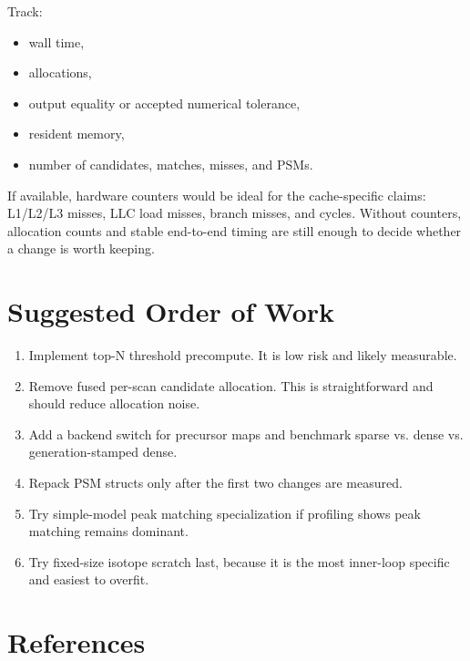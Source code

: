 \documentclass[11pt]{article}
\begin{document}
Track:

\begin{itemize}
  \item wall time,
  \item allocations,
  \item output equality or accepted numerical tolerance,
  \item resident memory,
  \item number of candidates, matches, misses, and PSMs.
\end{itemize}

If available, hardware counters would be ideal for the cache-specific claims:
L1/L2/L3 misses, LLC load misses, branch misses, and cycles. Without counters,
allocation counts and stable end-to-end timing are still enough to decide
whether a change is worth keeping.

\section*{Suggested Order of Work}

\begin{enumerate}
  \item Implement top-N threshold precompute. It is low risk and likely
        measurable.
  \item Remove fused per-scan candidate allocation. This is straightforward and
        should reduce allocation noise.
  \item Add a backend switch for precursor maps and benchmark sparse vs. dense
        vs. generation-stamped dense.
  \item Repack PSM structs only after the first two changes are measured.
  \item Try simple-model peak matching specialization if profiling shows peak
        matching remains dominant.
  \item Try fixed-size isotope scratch last, because it is the most inner-loop
        specific and easiest to overfit.
\end{enumerate}

\section*{References}
\end{document}
